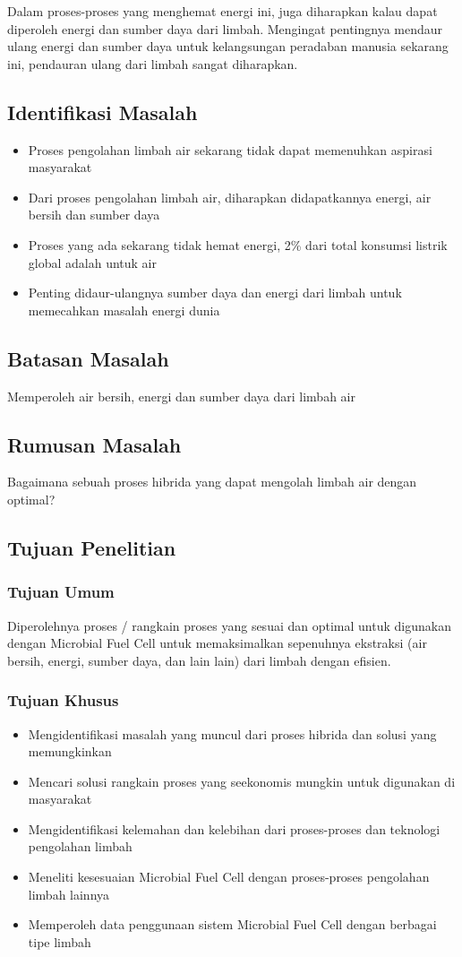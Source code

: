 \documentclass[10pt,a4paper,hidelinks]{article}
\begin{document}
    Dalam proses-proses yang menghemat energi ini, juga diharapkan kalau dapat diperoleh energi dan sumber daya dari limbah. Mengingat pentingnya mendaur ulang energi dan sumber daya untuk kelangsungan peradaban manusia sekarang ini, pendauran ulang dari limbah sangat diharapkan.
    
	\subsection{Identifikasi Masalah}
	\begin{itemize}
	\item Proses pengolahan limbah air sekarang tidak dapat memenuhkan aspirasi masyarakat
	\item Dari proses pengolahan limbah air, diharapkan didapatkannya energi, air bersih dan sumber daya
	\item Proses yang ada sekarang tidak hemat energi, 2\% dari total konsumsi listrik global adalah untuk air
	\item Penting didaur-ulangnya sumber daya dan energi dari limbah untuk memecahkan masalah energi dunia
	\end{itemize}
	\subsection{Batasan Masalah}
	Memperoleh air bersih, energi dan sumber daya dari limbah air
	\subsection{Rumusan Masalah}
	Bagaimana sebuah proses hibrida yang dapat mengolah limbah air dengan optimal?
	\subsection{Tujuan Penelitian}
	\subsubsection{Tujuan Umum}
	Diperolehnya proses / rangkain proses yang sesuai dan optimal untuk digunakan dengan Microbial Fuel Cell untuk memaksimalkan sepenuhnya ekstraksi (air bersih, energi, sumber daya, dan lain lain) dari limbah dengan efisien.
	\subsubsection{Tujuan Khusus}
	\begin{itemize}
	\item Mengidentifikasi masalah yang muncul dari proses hibrida dan solusi yang memungkinkan
	\item Mencari solusi rangkain proses yang seekonomis mungkin untuk digunakan di masyarakat
	\item Mengidentifikasi kelemahan dan kelebihan dari proses-proses dan teknologi pengolahan limbah
	\item Meneliti kesesuaian Microbial Fuel Cell dengan proses-proses pengolahan limbah lainnya
	\item Memperoleh data penggunaan sistem Microbial Fuel Cell dengan berbagai tipe limbah
	\end{itemize}
\end{document}
